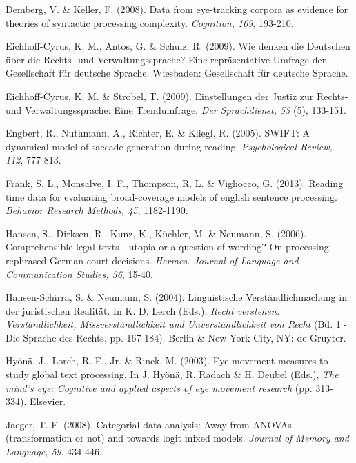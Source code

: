 \documentclass[output=paper]{langsci/langscibook}
\begin{document}
Demberg, V. \& Keller, F. (2008). Data from eye-tracking corpora as evidence for theories of syntactic processing complexity. \textit{Cognition, 109}, 193-210.



Eichhoff-Cyrus, K. M., Antos, G. \& Schulz, R. (2009). Wie denken die Deutschen über die Rechts- und Verwaltungssprache? Eine repräsentative Umfrage der Gesellschaft für deutsche Sprache. Wiesbaden: Gesellschaft für deutsche Sprache.



Eichhoff-Cyrus, K. M. \& Strobel, T. (2009). Einstellungen der Justiz zur Rechts- und Verwaltungssprache: Eine Trendumfrage. \textit{Der Sprachdienst, 53} (5), 133-151.



Engbert, R., Nuthmann, A., Richter, E. \& Kliegl, R. (2005). SWIFT: A dynamical model of saccade generation during reading. \textit{Psychological Review, 112}, 777-813.



Frank, S. L., Monsalve, I. F., Thompson, R. L. \& Vigliocco, G. (2013). Reading time data for evaluating broad-coverage models of english sentence processing. \textit{Behavior Research Methods, 45}, 1182-1190.



Hansen, S., Dirksen, R., Kunz, K., Küchler, M. \& Neumann, S. (2006). Comprehensible legal texts - utopia or a question of wording? On processing rephrased German court decisions. \textit{Hermes. Journal of Language and Communication Studies, 36}, 15-40.



Hansen-Schirra, S. \& Neumann, S. (2004). Linguistische Verständlichmachung in der juristischen Realität. In K. D. Lerch (Eds.), \textit{Recht verstehen. Verständlichkeit, Missverständlichkeit und Unverständlichkeit von Recht} (Bd. 1 - Die Sprache des Rechts, pp. 167-184). Berlin \& New York City, NY: de Gruyter.



Hyönä, J., Lorch, R. F., Jr. \& Rinck, M. (2003). Eye movement measures to study global text processing. In J. Hyo\"{ }na\"{ }, R. Radach \& H. Deubel (Eds.), \textit{The mind’s eye: Cognitive and applied aspects of eye movement research} (pp. 313-334). Elsevier.



Jaeger, T. F. (2008). Categorial data analysis: Away from ANOVAs (transformation or not) and towards logit mixed models. \textit{Journal of Memory and Language, 59}, 434-446.
\end{document}
